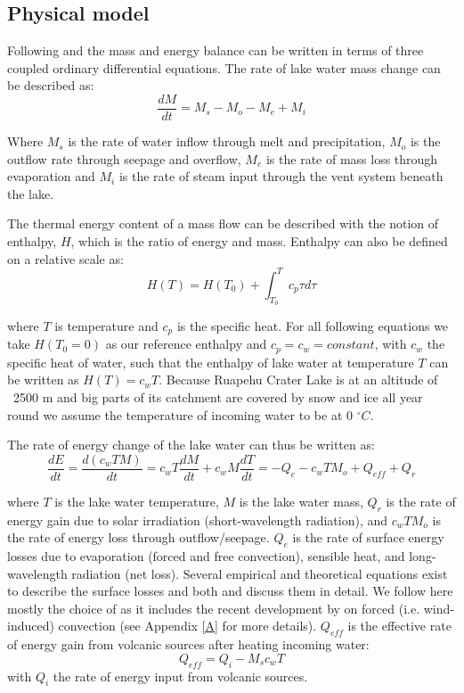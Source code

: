 \documentclass{bmc_template/bmcart}
\begin{document}
\subsection*{Physical model}\label{phm}

Following \citet{Hurst1991} and \citet{Stevenson1992} the mass and energy balance
can be written in terms of three coupled ordinary differential equations. The
rate of lake water mass change can be described as:
\begin{equation}\label{ode_M}
	\frac{dM}{dt} = M_s - M_o - M_e + M_i
\end{equation}

Where $M_s$ is the rate of water inflow through melt and precipitation, $M_o$
is the outflow rate through seepage and overflow, $M_e$ is the rate of mass
loss through evaporation and $M_i$ is the rate of steam input through the vent
system beneath the lake.

The thermal energy content of a mass flow can be described with the notion of
enthalpy, $H$, which is the ratio of energy and mass. Enthalpy can also be defined
on a relative scale as:
\begin{equation}
	H(T) = H(T_0) + \int_{T_0}^{T}c_p\tau d\tau
\end{equation}

where $T$ is temperature and $c_p$ is the specific heat. For all following
equations we take $H(T_0=0)$ as our reference enthalpy and $c_p=c_w=constant$,
with $c_w$ the specific heat of water, such that the enthalpy of lake water at
temperature $T$ can be written as $H(T) = c_w T$. Because Ruapehu Crater Lake
is at an altitude of ~2500 m and big parts of its catchment are covered by snow
and ice all year round we assume the temperature of incoming water to be at 0
$^{\circ}C$.

The rate of energy change of the lake water can thus be written as:
\begin{equation}\label{ode_E}
    \frac{dE}{dt}=\frac{d(c_wTM)}{dt}=c_wT\frac{dM}{dt} + c_wM\frac{dT}{dt} =
	-Q_e - c_wTM_o + Q_{eff} + Q_r
\end{equation}
      
where $T$ is the lake water temperature, $M$ is the lake water mass, $Q_r$ is
the rate of energy gain due to solar irradiation (short-wavelength radiation),
and $c_wTM_o$ is the rate of energy loss through outflow/seepage. $Q_e$ is
the rate of surface energy losses due to evaporation (forced and free
convection), sensible heat, and long-wavelength radiation (net loss). Several
empirical and theoretical equations exist to describe the surface losses and
both \citet{Stevenson1992} and \citet{Hurst2015} discuss them in detail. We
follow here mostly the choice of \citet{Hurst2015} as it includes the recent
development by \citet{Sartori2000} on forced (i.e. wind-induced) convection
(see Appendix \ref{A} for more details). $Q_{eff}$ is the effective rate of
energy gain from volcanic sources after heating incoming water:
\begin{equation}
	Q_{eff}=Q_i - M_s c_w T
\end{equation}
with $Q_i$ the rate of energy input from volcanic sources.
\end{document}
